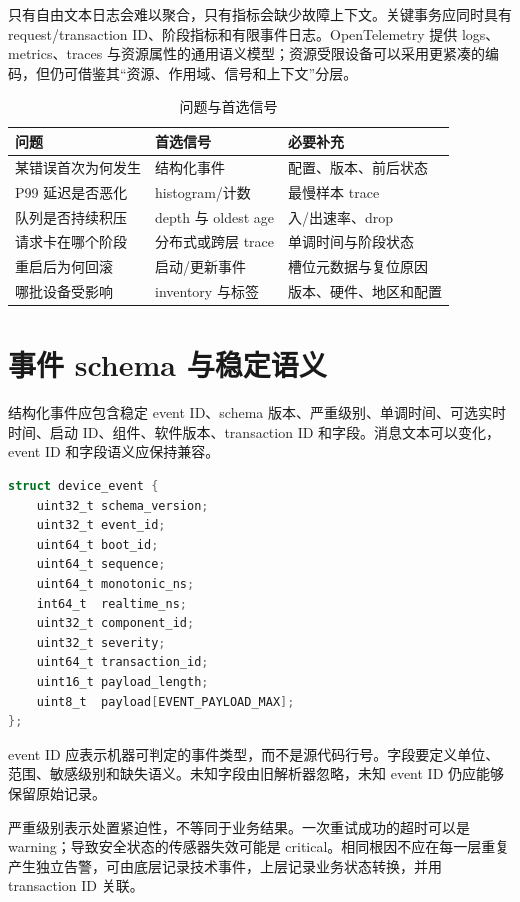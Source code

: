 只有自由文本日志会难以聚合，只有指标会缺少故障上下文。关键事务应同时具有 request/transaction ID、阶段指标和有限事件日志。OpenTelemetry 提供 logs、metrics、traces 与资源属性的通用语义模型\cite{opentelemetry-spec}；资源受限设备可以采用更紧凑的编码，但仍可借鉴其“资源、作用域、信号和上下文”分层。

\begin{table}[H]
  \centering
  \caption{问题与首选信号}
  \begin{tabular}{p{42mm}p{34mm}p{50mm}}
    \hline
    问题 & 首选信号 & 必要补充 \\
    \hline
    某错误首次为何发生 & 结构化事件 & 配置、版本、前后状态 \\
    P99 延迟是否恶化 & histogram/计数 & 最慢样本 trace \\
    队列是否持续积压 & depth 与 oldest age & 入/出速率、drop \\
    请求卡在哪个阶段 & 分布式或跨层 trace & 单调时间与阶段状态 \\
    重启后为何回滚 & 启动/更新事件 & 槽位元数据与复位原因 \\
    哪批设备受影响 & inventory 与标签 & 版本、硬件、地区和配置 \\
    \hline
  \end{tabular}
\end{table}

\section{事件 schema 与稳定语义}

结构化事件应包含稳定 event ID、schema 版本、严重级别、单调时间、可选实时时间、启动 ID、组件、软件版本、transaction ID 和字段。消息文本可以变化，event ID 和字段语义应保持兼容。

\begin{lstlisting}[language=C,caption={设备事件的逻辑结构}]
struct device_event {
    uint32_t schema_version;
    uint32_t event_id;
    uint64_t boot_id;
    uint64_t sequence;
    uint64_t monotonic_ns;
    int64_t  realtime_ns;
    uint32_t component_id;
    uint32_t severity;
    uint64_t transaction_id;
    uint16_t payload_length;
    uint8_t  payload[EVENT_PAYLOAD_MAX];
};
\end{lstlisting}

event ID 应表示机器可判定的事件类型，而不是源代码行号。字段要定义单位、范围、敏感级别和缺失语义。未知字段由旧解析器忽略，未知 event ID 仍应能够保留原始记录。

严重级别表示处置紧迫性，不等同于业务结果。一次重试成功的超时可以是 warning；导致安全状态的传感器失效可能是 critical。相同根因不应在每一层重复产生独立告警，可由底层记录技术事件，上层记录业务状态转换，并用 transaction ID 关联。

